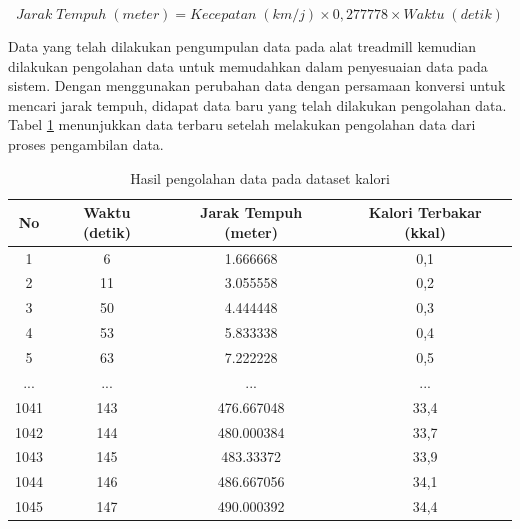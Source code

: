 \begin{equation}
  \label{eq:KonversiJarakTempuh}
  Jarak \; Tempuh \; (meter) = Kecepatan \; (km/j) \times 0,277778 \times Waktu \; (detik)
\end{equation}

Data yang telah dilakukan pengumpulan data pada alat treadmill kemudian dilakukan pengolahan data untuk memudahkan dalam penyesuaian data pada sistem. Dengan menggunakan perubahan data dengan persamaan konversi untuk mencari jarak tempuh, didapat data baru yang telah dilakukan pengolahan data. Tabel \ref{tb:OlahDatasetRegresi} menunjukkan data terbaru setelah melakukan pengolahan data dari proses pengambilan data. 

\begin{longtable}{|c|c|c|c|}
  \caption{Hasil pengolahan data pada dataset kalori}
  \label{tb:OlahDatasetRegresi}                                   \\
  \hline
  \rowcolor[HTML]{C0C0C0}
  \textbf{No} & \textbf{Waktu (detik)} & \textbf{Jarak Tempuh (meter)} & \textbf{Kalori Terbakar (kkal)} \\
  \hline
  1   & 6    & 1.666668    & 0,1     \\
  \hline
  2   & 11    & 3.055558    & 0,2     \\
  \hline
  3   & 50    & 4.444448    & 0,3     \\
  \hline
  4   & 53    & 5.833338    & 0,4     \\
  \hline
  5   & 63    & 7.222228    & 0,5     \\
  \hline
  ...   & ...    & ...    & ...     \\
  \hline
  1041   & 143    & 476.667048    & 33,4     \\
  \hline
  1042   & 144    & 480.000384    & 33,7     \\
  \hline
  1043   & 145    & 483.33372    & 33,9     \\
  \hline
  1044   & 146    & 486.667056    & 34,1     \\
  \hline
  1045   & 147    & 490.000392    & 34,4     \\
  \hline
\end{longtable}

